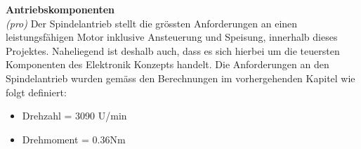 \textbf{Antriebskomponenten}\\
\textit{(pro)} Der Spindelantrieb stellt die grössten Anforderungen an einen leistungsfähigen Motor inklusive Ansteuerung und Speisung, innerhalb dieses Projektes. Naheliegend ist deshalb auch, dass es sich hierbei um die teuersten Komponenten des Elektronik Konzepts handelt. Die Anforderungen an den Spindelantrieb wurden gemäss den Berechnungen im vorhergehenden Kapitel wie folgt definiert: 

\begin{itemize}
	\item Drehzahl = 3090 U/min
	\item Drehmoment = 0.36Nm	
\end{itemize}




